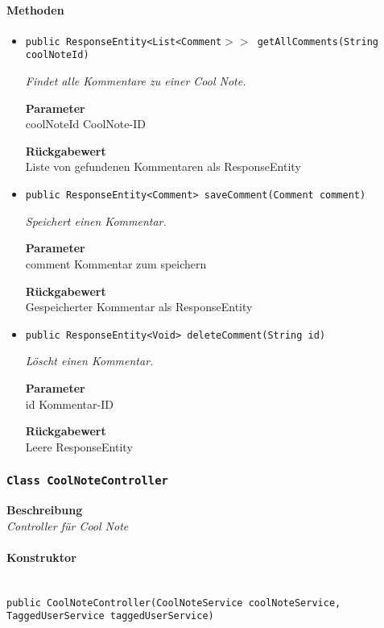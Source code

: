      \paragraph*{Methoden}
     \begin{itemize}
     	\item{\texttt{public ResponseEntity<List<Comment$>>$ getAllComments(String coolNoteId)}}
     	
     	\textit{Findet alle Kommentare zu einer Cool Note.}
     	
     	\textbf{Parameter} \\
     	coolNoteId CoolNote-ID
     	
     	\textbf{Rückgabewert} \\
     	Liste von gefundenen Kommentaren als ResponseEntity        \item{\texttt{public ResponseEntity<Comment> saveComment(Comment comment)}}
     	
     	\textit{Speichert einen Kommentar.}
     	
     	\textbf{Parameter} \\
     	comment Kommentar zum speichern
     	
     	\textbf{Rückgabewert} \\
     	Gespeicherter Kommentar als ResponseEntity        \item{\texttt{public ResponseEntity<Void> deleteComment(String id)}}
     	
     	\textit{Löscht einen Kommentar.}
     	
     	\textbf{Parameter} \\
     	id Kommentar-ID
     	
     	\textbf{Rückgabewert} \\
     	Leere ResponseEntity
     \end{itemize}
     \subsubsection{\texttt{Class CoolNoteController}}
     \textbf{Beschreibung} \\
     \textit{Controller für Cool Note}
     \paragraph*{Konstruktor}\mbox{} \\
     \texttt{public CoolNoteController(CoolNoteService coolNoteService, TaggedUserService taggedUserService)} \\
